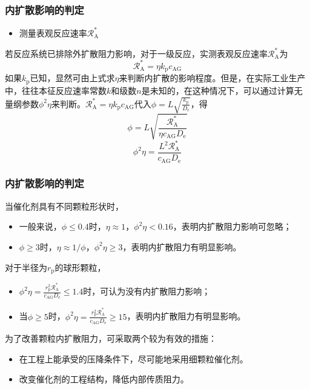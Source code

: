 \begin{frame}
    \frametitle{内扩散影响的判定}
    
    \begin{itemize}
        \item[2.] 测量表观反应速率$\mathscr{R}_{\mathrm{A}}^{*}$
    \end{itemize}
    

    若反应系统已排除外扩散阻力影响，对于一级反应，实测表观反应速率$\mathscr{R}_{\mathrm{A}}^{*}$为
    \[
        \mathscr{R}_{\mathrm{A}}^{*}=\eta k_{\mathrm{p}} c_{\mathrm{AG}}
    \]
    如果$k_{\mathrm{p}}$已知，显然可由上式求$\eta$来判断内扩散的影响程度。但是，在实际工业生产中，往往本征反应速率常数$k$和级数$n$是未知的，在这种情况下，可以通过计算无量纲参数$\phi^2\eta$来判断。$\mathscr{R}_{\mathrm{A}}^{*}=\eta k_{\mathrm{p}} c_{\mathrm{AG}}$代入$\phi = L\sqrt{\frac{k_\mathrm{p}}{D_{\mathrm{e}}}}$，得
    \[
        \phi=L \sqrt{\frac{\mathscr{R}_{\mathrm{A}}^{*}}{\eta c_{\mathrm{AG}}D_{\mathrm{e}}}}
    \]
    \[
        \phi^2\eta = \frac{L^2 \mathscr{R}_{\mathrm{A}}^{*}}{c_{\mathrm{AG}}D_{\mathrm{e}}}
    \]    

\end{frame}


\begin{frame}
    \frametitle{内扩散影响的判定}
    当催化剂具有不同颗粒形状时，
    \begin{itemize}
        \item 一般来说，$\phi \leqslant 0.4$时，$\eta \approx 1$，$\phi^2\eta <0.16$，表明内扩散阻力影响可忽略；
        \item $\phi \geqslant 3$时，$\eta \approx 1/\phi$，$\phi^2\eta \geqslant 3$，表明内扩散阻力有明显影响。
    \end{itemize}

    对于半径为$r_\mathrm{p}$的球形颗粒，
    \begin{itemize}
        \item $\phi^2\eta = \frac{r_\mathrm{p}^2 \mathscr{R}_{\mathrm{A}}^{*}}{c_{\mathrm{AG}}D_{\mathrm{e}}} \leqslant 1.4$时，可认为没有内扩散阻力影响；
        \item 当$\phi \geqslant 5$时，$\phi^2\eta = \frac{r_\mathrm{p}^2 \mathscr{R}_{\mathrm{A}}^{*}}{c_{\mathrm{AG}}D_{\mathrm{e}}} \geqslant 15$，表明内扩散阻力有明显影响。
    \end{itemize}
    为了改善颗粒内扩散阻力，可采取两个较为有效的措施：
    \begin{itemize}
        \item 在工程上能承受的压降条件下，尽可能地采用细颗粒催化剂。
        \item 改变催化剂的工程结构，降低内部传质阻力。
    \end{itemize}

\end{frame}

